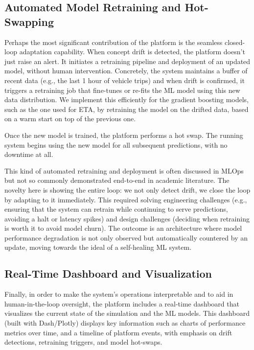 \subsection{Automated Model Retraining and Hot-Swapping}
Perhaps the most significant contribution of the platform is the seamless closed-loop adaptation capability.
When concept drift is detected, the platform doesn't just raise an alert.
It initiates a retraining pipeline and deployment of an updated model, without human intervention.
Concretely, the system maintains a buffer of recent data (e.g., the last 1 hour of vehicle trips) and when drift is confirmed, it triggers a retraining job that fine-tunes or re-fits the ML model using this new data distribution.
We implement this efficiently for the gradient boosting models, such as the one used for ETA, by retraining the model on the drifted data, based on a warm start on top of the previous one.

Once the new model is trained, the platform performs a hot swap.
The running system begins using the new model for all subsequent predictions, with no downtime at all.

This kind of automated retraining and deployment is often discussed in MLOps but not so commonly demonstrated end-to-end in academic literature.
The novelty here is showing the entire loop: we not only detect drift, we close the loop by adapting to it immediately.
This required solving engineering challenges (e.g., ensuring that the system can retrain while continuing to serve predictions, avoiding a halt or latency spikes) and design challenges (deciding when retraining is worth it to avoid model churn).
The outcome is an architecture where model performance degradation is not only observed but automatically countered by an update, moving towards the ideal of a self-healing ML system.

\subsection{Real-Time Dashboard and Visualization}
Finally, in order to make the system's operations interpretable and to aid in human-in-the-loop oversight, the platform includes a real-time dashboard that visualizes the current state of the simulation and the ML models.
This dashboard (built with Dash/Plotly) displays key information such as charts of performance metrics over time, and a timeline of platform events, with emphasis on drift detections, retraining triggers, and model hot-swaps.


